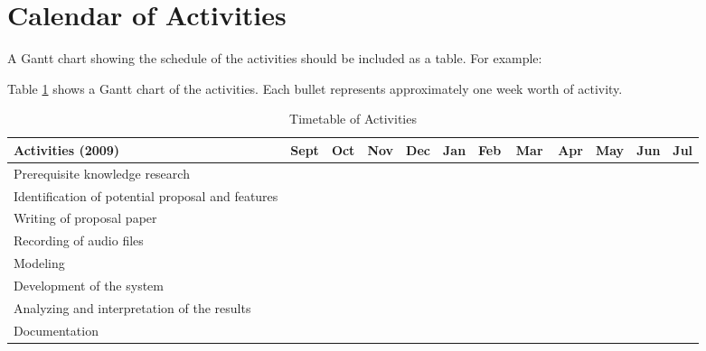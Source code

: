 \section{Calendar of Activities}

A Gantt chart showing the schedule of the activities should be included as a table. For example:

Table \ref{tab:timetableactivities} shows a Gantt chart of the activities.  Each bullet represents approximately
one week worth of activity.

%
%
\newcommand{\weekone}{\textbullet}
\newcommand{\weektwo}{\textbullet \textbullet}
\newcommand{\weekthree}{\textbullet \textbullet \textbullet}
\newcommand{\weekfour}{\textbullet \textbullet \textbullet \textbullet}

%
%
\begin{comment}
   \newcommand{\weekone}{$\star$}
   \newcommand{\weektwo}{$\star \star$}
   \newcommand{\weekthree}{$\star \star \star$}
   \newcommand{\weekfour}{$\star \star \star \star$ }
\end{comment}

\begin{table}[!]   %
\setlength{\extrarowheight}{2pt}
\setlength{\tabcolsep}{0.2em}
\centering
\caption{Timetable of Activities} \vspace{0.25em}
\begin{tabular}{|p{2in}|c|c|c|c|c|c|c|c|c|c|c|} \hline
\centering Activities (2009) & Sept & Oct & Nov & Dec & Jan & Feb & Mar & Apr & May & Jun & Jul\\ \hline
Prerequisite knowledge research & ~~~\weektwo & ~~~\weektwo & & & & & & & & &\\ \hline
Identification of potential proposal and features &  & \weektwo & \weekthree & & & & & & & &\\ \hline
Writing of proposal paper     &   &  & \weekone & \weekfour & & & & & & &\\ \hline
Recording of audio files    & & &  & & & \weektwo~~~ &  & & & &\\ \hline
Modeling     &   &  &  & & & \weekone & \weekthree & \weekone & & &\\ \hline
Development of the system &   &  &  &  &  &  & \weekone~~~~~ & \weekthree & \weektwo & \weekone &\\ \hline
Analyzing and interpretation of the results & & & & & & & & & \weekthree & \weekone &\\ \hline
Documentation & ~~~\weektwo  & \weekfour & \weekfour & \weekfour &  & \weekthree & \weekfour & \weekthree & \weekfour & \weekone & \weekone \\ \hline
\end{tabular}
\label{tab:timetableactivities}
\end{table}

